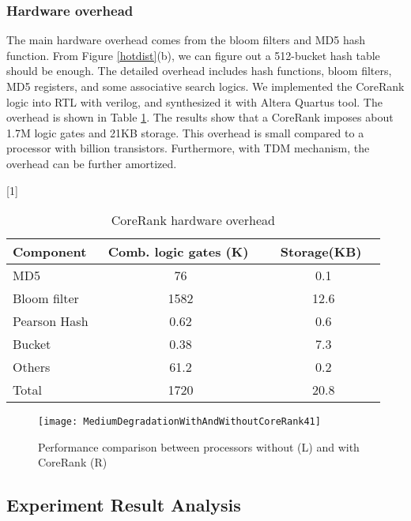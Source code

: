 \subsubsection{Hardware overhead}
The main hardware overhead comes from the bloom filters and MD5 hash function. From Figure \ref{hotdist}(b), we can figure out a 512-bucket hash table should be enough. The detailed overhead includes hash functions, bloom filters, MD5 registers, and some associative search logics. We implemented the CoreRank logic into RTL with verilog, and synthesized it with Altera Quartus tool. The overhead is shown in Table \ref{overhead}. The results show that a CoreRank imposes about 1.7M logic gates and 21KB storage. This overhead is small compared to a processor with  billion transistors.   Furthermore, with TDM mechanism, the overhead can be further amortized.

\begin{table}[t!]
\caption{CoreRank hardware overhead}\label{overhead}
\setlength{\tabcolsep}{4mm}
\begin{center}\small
\vspace{0.2cm}
\scalebox{1}[1]{
\begin{tabular}{@{}lcc}
\toprule
 \textbf{Component}   &  \ \textbf{Comb. logic gates (K)} \  & \ \textbf{Storage(KB)} \ \\
\midrule
MD5                     &76      &       0.1       \\
 Bloom filter    &  1582   &   12.6       \\
Pearson Hash  & 0.62 & 0.6  \\
Bucket                &   0.38 & 7.3    \\
Others                 &   61.2   & 0.2 \\
Total                   &1720  &   20.8   \\
\bottomrule
\end{tabular}}

\end{center}
\end{table}

\begin{figure*}[t]

 \centering
  \texttt{[image: MediumDegradationWithAndWithoutCoreRank41]}\\
\caption{Performance comparison between processors without (L) and with CoreRank (R)}
\label{comp1}
\end{figure*}

\subsection{Experiment Result Analysis} \label{sec:3}
